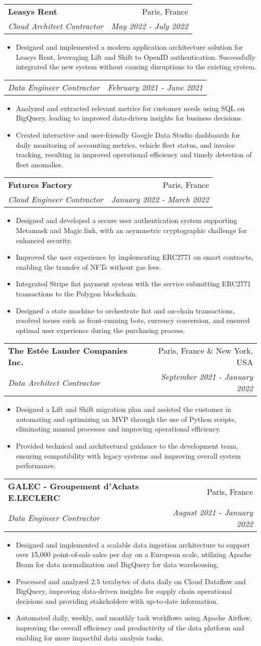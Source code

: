 \documentclass[letterpaper,11pt]{article}
\makeatletter
\newcommand{\resumeItem}[1]{
  \item\small{#1 \vspace{-2pt}}
}
\newcommand{\resumeSubheading}[4]{
  \vspace{-1pt}\item
    \begin{tabular*}{0.97\textwidth}[t]{l@{\extracolsep{\fill}}r}
      \textbf{#1} & #2 \\
      \textit{\small#3} & \textit{\small #4} \\
    \end{tabular*}\vspace{-5pt}
}
\newcommand{\resumeSubSubheading}[2]{
  \begin{tabular*}{0.97\textwidth}{l@{\extracolsep{\fill}}r}
    \textit{\small#1} & \textit{\small #2} \\
  \end{tabular*}\vspace{-5pt}
}
\newcommand{\resumeItemListStart}{\begin{itemize}}
\newcommand{\resumeItemListEnd}{\end{itemize}\vspace{-5pt}}
\makeatother
\begin{document}
\resumeSubheading{Leasys Rent}
{Paris, France}
{Cloud Architect Contractor}
{May 2022 - July 2022}
\resumeItemListStart{}
\resumeItem{
	Designed and implemented a modern application architecture solution for Leasys Rent,
	leveraging Lift and Shift to OpenID authentication. Successfully integrated the
	new system without causing disruptions to the existing system.
}
\resumeItemListEnd{}


\resumeSubSubheading{Data Engineer Contractor}
{February 2021 - June 2021}
\resumeItemListStart{}
\resumeItem{
	Analyzed and extracted relevant metrics for customer needs using SQL on
	BigQuery, leading to improved data-driven insights for business decisions.
}
\resumeItem{
	Created interactive and user-friendly Google Data Studio dashboards for daily
	monitoring of accounting metrics, vehicle fleet status, and invoice tracking,
	resulting in improved operational efficiency and timely detection of fleet
	anomalies.
}
\resumeItemListEnd{}


\resumeSubheading{Futures Factory}
{Paris, France}
{Cloud Engineer Contractor}
{January 2022 - March 2022}
\resumeItemListStart{}
\resumeItem{
	Designed and developed a secure user authentication system supporting Metamask
	and Magic.link, with an asymmetric cryptographic challenge for enhanced
	security.
}
\resumeItem{
	Improved the user experience by implementing ERC2771 on smart contracts,
	enabling the transfer of NFTs without gas fees.
}
\resumeItem{
	Integrated Stripe fiat payment system with the service submitting ERC2771
	transactions to the Polygon blockchain.
}
\resumeItem{
	Designed a state machine to orchestrate fiat and on-chain transactions, resolved
	issues such as front-running bots, currency conversion, and ensured optimal user
	experience during the purchasing process.
}
\resumeItemListEnd{}


\resumeSubheading{The Estée Lauder Companies Inc.}
{Paris, France \& New York, USA}
{Data Architect Contractor}
{September 2021 - January 2022}
\resumeItemListStart{}
\resumeItem{
	Designed a Lift and Shift migration plan and assisted the customer in automating
	and optimizing an MVP through the use of Python scripts, eliminating manual
	processes and improving operational efficiency.
}
\resumeItem{
	Provided technical and architectural guidance to the development team, ensuring
	compatibility with legacy systems and improving overall system performance.
}
\resumeItemListEnd{}


\resumeSubheading{GALEC - Groupement d'Achats E.LECLERC}
{Paris, France}
{Data Engineer Contractor}
{August 2021 - January 2022}
\resumeItemListStart{}
\resumeItem{
	Designed and implemented a scalable data ingestion architecture to support over
	15,000 point-of-sale sales per day on a European scale, utilizing Apache Beam
	for data normalization and BigQuery for data warehousing.
}
\resumeItem{
	Processed and analyzed 2.5 terabytes of data daily on Cloud Dataflow and
	BigQuery, improving data-driven insights for supply chain operational decisions
	and providing stakeholders with up-to-date information.
}
\resumeItem{
	Automated daily, weekly, and monthly task workflows using Apache Airflow,
	improving the overall efficiency and productivity of the data platform and
	enabling for more impactful data analysis tasks.
}
\resumeItemListEnd{}
\end{document}

